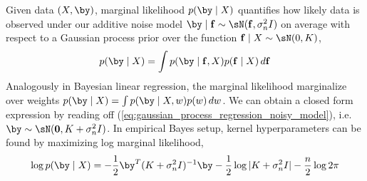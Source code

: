 \documentclass[11pt]{article}
\begin{document}
Given data $(X,\by)$, marginal likelihood $p(\by\mid X)$ quantifies how likely data is observed under our additive noise model $\by\mid \mathbf{f} \sim \sN(\mathbf{f},\sigma_n^2 I)$ on average with respect to a Gaussian process prior over the function $\mathbf{f}\mid X \sim \sN(0,K)$,
\begin{align}
    p(\by\mid X)
        = \int p(\by\mid \mathbf{f},X) p(\mathbf{f}\mid X) \, d\mathbf{f}
\end{align}
Analogously in Bayesian linear regression, the marginal likelihood marginalize over weights $p(\by\mid X) = \int p(\by\mid X,w)p(w) \, dw$. We can obtain a closed form expression by reading off (\ref{eq:gaussian_process_regression_noisy_model}), i.e. $\by \sim \sN(\mathbf{0}, K+\sigma_n^2 I)$. In empirical Bayes setup, kernel hyperparameters can be found by maximizing log marginal likelihood,
\begin{align}
    \log p(\by\mid X)
        = -\frac{1}{2} \by^T  (K+\sigma_n^2 I)^{-1}\by - \frac{1}{2} \log |K+\sigma_n^2I| - \frac{n}{2} \log 2\pi 
\end{align}


 


\newpage
\printbibliography 
\end{document}
